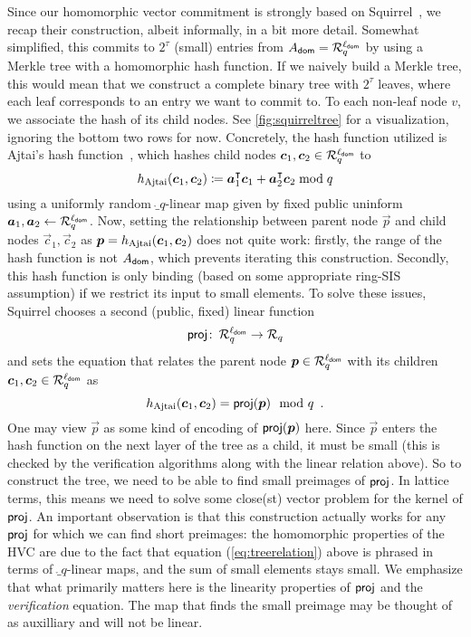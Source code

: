Since our homomorphic vector commitment is strongly based on Squirrel~\cite{CCS:FleSimZha22}, we recap their construction, albeit informally, in a bit more detail.
Somewhat simplified, this commits to $2^\tau$ (small) entries from $A_{\mathsf{dom}} = \mathcal{R}_q^{\ell_{\mathsf{dom}}}$ by using a Merkle tree with a homomorphic hash function.
If we naively build a Merkle tree, this would mean that we construct a complete binary tree with $2^\tau$ leaves, where each leaf corresponds to an entry we want to commit to.
To each non-leaf node $v$, we associate the hash of its child nodes.
See \autoref{fig:squirreltree} for a visualization, ignoring the bottom two rows for now.
Concretely, the hash function utilized is Ajtai's hash function~\cite{ICALP:Ajtai99}, which hashes child nodes $\boldsymbol{c}_1, \boldsymbol{c}_2\in\mathcal{R}_q^{\ell_{\mathsf{dom}}}$ to
\[
h_\mathrm{Ajtai}(\boldsymbol{c}_1,\boldsymbol{c}_2) \coloneqq \boldsymbol{a}_1^\intercal \boldsymbol{c}_1 + \boldsymbol{a}_2^\intercal \boldsymbol{c}_2 \bmod q
\]
using a uniformly random $\ring_q$-linear map given by fixed public uninform $\boldsymbol{a}_1,\boldsymbol{a}_2\gets \mathcal{R}_q^{\ell_{\mathsf{dom}}}$.
Now, setting the relationship between parent node $\vec{p}$ and child nodes $\vec{c}_1, \vec{c}_2$ as $\boldsymbol{p}=h_\mathrm{Ajtai}(\boldsymbol{c}_1,\boldsymbol{c}_2)$ does not quite work: firstly, the range of the hash function is not $A_{\mathsf{dom}}$, which prevents iterating this construction.
Secondly, this hash function is only binding (based on some appropriate ring-SIS assumption) if we restrict its input to small elements.
To solve these issues, Squirrel chooses a second (public, fixed) linear function
\[
\mathsf{proj}\colon\,\mathcal{R}_q^{\ell_{\mathsf{dom}}} \to \mathcal{R}_q
\]
and sets the equation that relates the parent node $\boldsymbol{p}\in\mathcal{R}_q^{\ell_{\mathsf{dom}}}$ with its children $\boldsymbol{c}_1,\boldsymbol{c}_2\in\mathcal{R}_q^{\ell_{\mathsf{dom}}}$ as
\begin{equation}
h_\mathrm{Ajtai}(\boldsymbol{c}_1,\boldsymbol{c}_2) = \mathsf{proj}(\boldsymbol{p}) \mod q\enspace. \label{eq:treerelation}
\end{equation}
%
One may view $\vec{p}$ as some kind of encoding of $\mathsf{proj}(\boldsymbol{p})$ here. Since $\vec{p}$ enters the hash function on the next layer of the tree as a child, it must be small (this is checked by the verification algorithms along with the linear relation above).
So to construct the tree, we need to be able to find small preimages of $\mathsf{proj}$.
In lattice terms, this means we need to solve some close(st) vector problem for the kernel of $\mathsf{proj}$.
An important observation is that this construction actually works for any $\mathsf{proj}$ for which we can find short preimages:
the homomorphic properties of the HVC are due to the fact that equation (\ref{eq:treerelation}) above
is phrased in terms of $\ring_q$-linear maps, and the sum of small elements stays small.
We emphasize that what primarily matters here is the linearity properties of $\mathsf{proj}$ and the \emph{verification} equation. The map that finds the small preimage may be thought of as auxilliary and will not be linear.

